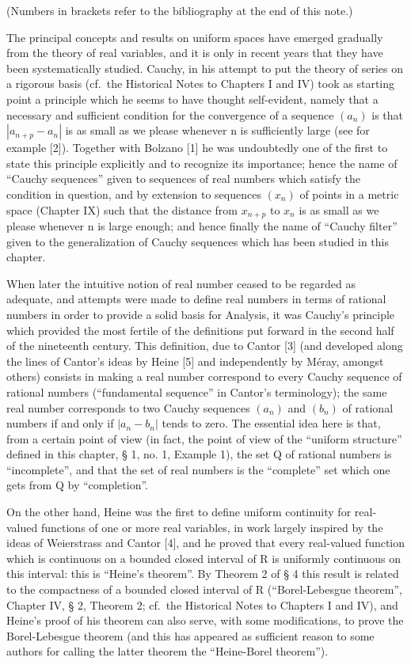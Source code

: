 
(Numbers in brackets refer to the bibliography at the end of this note.)

The principal concepts and results on uniform spaces have emerged gradually from the theory of real variables, and it is only in recent years that they have been systematically studied. Cauchy, in his attempt to put the theory of series on a rigorous basis (cf.~the Historical Notes to Chapters I and IV) took as starting point a principle which he seems to have thought self-evident, namely that a necessary and sufficient condition for the convergence of a sequence \((a_{n})\) is that \(|a_{n+p} - a_{n}|\) is as small as we please whenever n is sufficiently large (see for example {[}2{]}). Together with Bolzano {[}1{]} he was undoubtedly one of the first to state this principle explicitly and to recognize its importance; hence the name of ``Cauchy sequences'' given to sequences of real numbers which satisfy the condition in question, and by extension to sequences \((x_{n})\) of points in a metric space (Chapter IX) such that the distance from \(x_{n+p}\) to \(x_{n}\) is as small as we please whenever n is large enough; and hence finally the name of ``Cauchy filter'' given to the generalization of Cauchy sequences which has been studied in this chapter.

When later the intuitive notion of real number ceased to be regarded as adequate, and attempts were made to define real numbers in terms of rational numbers in order to provide a solid basis for Analysis, it was Cauchy's principle which provided the most fertile of the definitions put forward in the second half of the nineteenth century. This definition, due to Cantor {[}3{]} (and developed along the lines of Cantor's ideas by Heine {[}5{]} and independently by Méray, amongst others) consists in making a real number correspond to every Cauchy sequence of rational numbers (``fundamental sequence'' in Cantor's terminology); the same real number corresponds to two Cauchy sequences \((a_{n})\) and \((b_{n})\) of rational numbers if and only if \(|a_{n} - b_{n}|\) tends to zero. The essential idea here is that, from a certain point of view (in fact, the point of view of the ``uniform structure'' defined in this chapter, § 1, no. 1, Example 1), the set Q of rational numbers is ``incomplete'', and that the set of real numbers is the ``complete'' set which one gets from Q by ``completion''.

On the other hand, Heine was the first to define uniform continuity for real-valued functions of one or more real variables, in work largely inspired by the ideas of Weierstrass and Cantor {[}4{]}, and he proved that every real-valued function which is continuous on a bounded closed interval of R is uniformly continuous on this interval: this is ``Heine's theorem''. By Theorem 2 of § 4 this result is related to the compactness of a bounded closed interval of R (``Borel-Lebesgue theorem'', Chapter IV, § 2, Theorem 2; cf.~the Historical Notes to Chapters I and IV), and Heine's proof of his theorem can also serve, with some modifications, to prove the Borel-Lebesgue theorem (and this has appeared as sufficient reason to some authors for calling the latter theorem the ``Heine-Borel theorem'').


